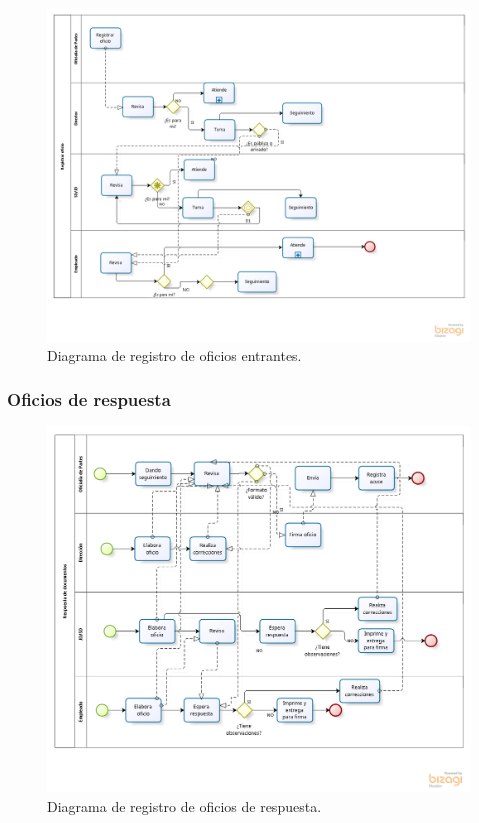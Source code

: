 	\begin{figure}[htbp!]
		\centering
			\includegraphics[width=1\textwidth]{images/procesoregistro.png}
		\caption{Diagrama de registro de oficios entrantes.}
		\label{fig:OficiosEntrantes}
	\end{figure}
	
	\subsubsection{Oficios de respuesta}
	
	\begin{figure}[htbp!]
		\centering
			\includegraphics[width=1\textwidth]{images/procesorespuesta.png}
		\caption{Diagrama de registro de oficios de respuesta.}
		\label{fig:OficiosRespuesta}
	\end{figure}
	
